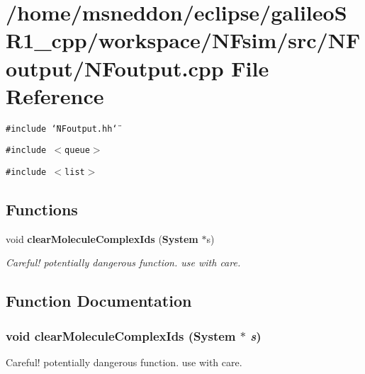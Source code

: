 \section{/home/msneddon/eclipse/galileoSR1\_\-cpp/workspace/NFsim/src/NFoutput/NFoutput.cpp File Reference}
\label{NFoutput_8cpp}


{\tt \#include \char`\"{}NFoutput.hh\char`\"{}}\par
{\tt \#include $<$queue$>$}\par
{\tt \#include $<$list$>$}\par
\subsection*{Functions}
\begin{CompactItemize}
\item 
void {\bf clearMoleculeComplexIds} ({\bf System} $\ast$s)
\begin{CompactList}\small\item\em Careful! potentially dangerous function. use with care. \item\end{CompactList}\end{CompactItemize}


\subsection{Function Documentation}
\subsubsection{\setlength{\rightskip}{0pt plus 5cm}void clearMoleculeComplexIds ({\bf System} $\ast$ {\em s})}\label{NFoutput_8cpp_1cd504a5c6f14f0979fe75d3e2a24928}


Careful! potentially dangerous function. use with care. 

